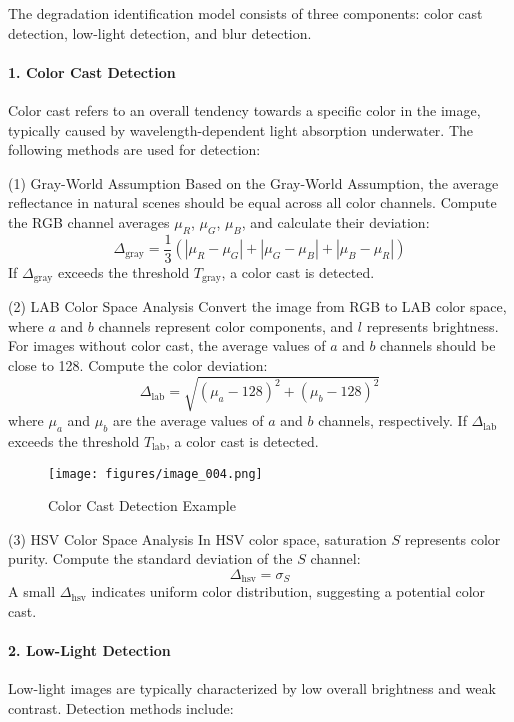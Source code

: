 \documentclass{apmcmthesis}
\begin{document}
The degradation identification model consists of three components: color cast detection, low-light detection, and blur detection.

\paragraph{1. Color Cast Detection}
Color cast refers to an overall tendency towards a specific color in the image, typically caused by wavelength-dependent light absorption underwater. The following methods are used for detection:

(1) Gray-World Assumption  
Based on the Gray-World Assumption, the average reflectance in natural scenes should be equal across all color channels. Compute the RGB channel averages $\mu_R$, $\mu_G$, $\mu_B$, and calculate their deviation:  
\[
\Delta_{\text{gray}} = \frac{1}{3} \left( |\mu_R - \mu_G| + |\mu_G - \mu_B| + |\mu_B - \mu_R| \right)
\]  
If $\Delta_{\text{gray}}$ exceeds the threshold $T_{\text{gray}}$, a color cast is detected.

(2) LAB Color Space Analysis  
Convert the image from RGB to LAB color space, where $a$ and $b$ channels represent color components, and $l$ represents brightness. For images without color cast, the average values of $a$ and $b$ channels should be close to 128. Compute the color deviation:  
\[
\Delta_{\text{lab}} = \sqrt{ (\mu_a - 128)^2 + (\mu_b - 128)^2 }
\]  
where $\mu_a$ and $\mu_b$ are the average values of $a$ and $b$ channels, respectively. If $\Delta_{\text{lab}}$ exceeds the threshold $T_{\text{lab}}$, a color cast is detected.

\begin{figure}[!ht]
    \centering
    \texttt{[image: figures/image\_004.png]}
    \caption{Color Cast Detection Example}
    \label{fig:example_1}
\end{figure}

(3) HSV Color Space Analysis  
In HSV color space, saturation $S$ represents color purity. Compute the standard deviation of the $S$ channel:  
\[
\Delta_{\text{hsv}} = \sigma_S
\]  
A small $\Delta_{\text{hsv}}$ indicates uniform color distribution, suggesting a potential color cast.

\paragraph{2. Low-Light Detection}
Low-light images are typically characterized by low overall brightness and weak contrast. Detection methods include:
\end{document}
